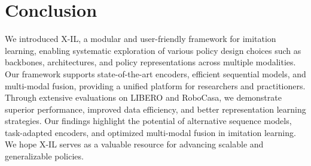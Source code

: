 \section{Conclusion}
We introduced X-IL, a modular and user-friendly framework for imitation learning, enabling systematic exploration of various policy design choices such as backbones, architectures, and policy representations across multiple modalities. Our framework supports state-of-the-art encoders, efficient sequential models, and multi-modal fusion, providing a unified platform for researchers and practitioners. Through extensive evaluations on LIBERO and RoboCasa, we demonstrate superior performance, improved data efficiency, and better representation learning strategies. Our findings highlight the potential of alternative sequence models, task-adapted encoders, and optimized multi-modal fusion in imitation learning. We hope X-IL serves as a valuable resource for advancing scalable and generalizable policies.